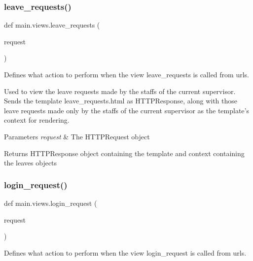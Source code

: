 \subsubsection{\texorpdfstring{leave\+\_\+requests()}{leave\_requests()}}
{\footnotesize\ttfamily def main.\+views.\+leave\+\_\+requests (\begin{DoxyParamCaption}\item[{}]{request }\end{DoxyParamCaption})}



Defines what action to perform when the view \textquotesingle{}leave\+\_\+requests\textquotesingle{} is called from urls. 

Used to view the leave requests made by the staffs of the current supervisor. Sends the template leave\+\_\+requests.\+html as H\+T\+T\+P\+Response, along with those leave requests made only by the staffs of the current supervisor as the template’s context for rendering. 
\begin{DoxyParams}{Parameters}
{\em request} & The H\+T\+T\+P\+Request object \\
\hline
\end{DoxyParams}
\begin{DoxyReturn}{Returns}
H\+T\+T\+P\+Response object containing the template and context containing the leaves objects 
\end{DoxyReturn}
\mbox{\label{namespacemain_1_1views_aa4b0b085bb5782a107fce5e03228e97b}} 
\subsubsection{\texorpdfstring{login\+\_\+request()}{login\_request()}}
{\footnotesize\ttfamily def main.\+views.\+login\+\_\+request (\begin{DoxyParamCaption}\item[{}]{request }\end{DoxyParamCaption})}



Defines what action to perform when the view \textquotesingle{}login\+\_\+request\textquotesingle{} is called from urls. 

